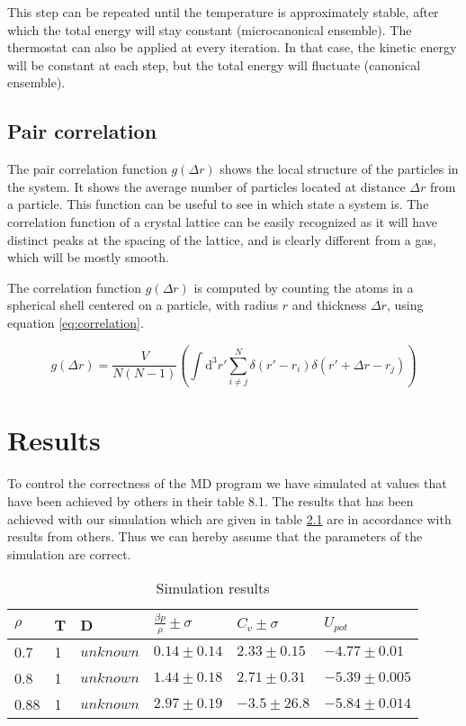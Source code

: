 \documentclass[12pt,a4paper]{report}
\begin{document}
This step can be repeated until the temperature is approximately stable, after which the total energy will stay constant (microcanonical ensemble). The thermostat can also be applied at every iteration. In that case, the kinetic energy will be constant at each step, but the total energy will fluctuate (canonical ensemble).

\section{Pair correlation}

The pair correlation function $g(\Delta r)$ shows the local structure of the particles in the system. It shows the average number of particles located at distance $\Delta r$ from a particle. This function can be useful to see in which state a system is. The correlation function of a crystal lattice can be easily recognized as it will have distinct peaks at the spacing of the lattice, and is clearly different from a gas, which will be mostly smooth.

The correlation function $g(\Delta r)$ is computed by counting the atoms in a spherical shell centered on a particle, with radius $r$ and thickness $\Delta r$, using equation \ref{eq:correlation}.

\begin{equation}\label{eq:correlation}
	g(\Delta r) = \frac{V}{N(N-1)} \left( \int \text{d}^3 r' \sum_{i \neq j}^{N} \delta(r'-r_i) \delta(r' + \Delta r - r_j) \right)
\end{equation}

\chapter{Results}

To control the correctness of the MD program we have simulated at values that have been achieved by others \cite{thijssen} in their table 8.1. The results that has been achieved with our simulation which are given in table \ref{table:results} are in accordance with results from others. Thus we can hereby assume that the parameters of the simulation are correct.
\begin{table}[h]
\caption{Simulation results}\label{table:results}
\begin{center}
	\begin{tabular}{| l | l | l | l | l | l |}
	\hline
	$\rho$ & T & D &$ \frac{\beta p}{\rho} \pm \sigma $& $C_v \pm \sigma$ &$ U_{pot}$ \\ \hline
	0.7 & 1 & $ unknown$ & $0.14\pm 0.14$ & $ 2.33 \pm 0.15$ & $-4.77\pm 0.01$   \\
	0.8 & 1 & $ unknown$ & $1.44\pm 0.18$ & $ 2.71 \pm 0.31$ & $-5.39\pm 0.005$   \\
	0.88 & 1 & $ unknown$ & $2.97\pm 0.19$ & $ -3.5 \pm 26.8$ & $-5.84\pm 0.014$   \\
	\hline
	\end{tabular}
\end{center}
\end{table}
\end{document}
